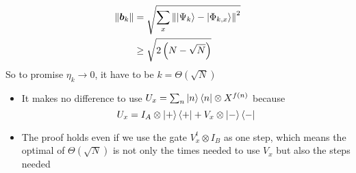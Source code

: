 \documentclass[11pt,a4paper]{article}%
\numberwithin{equation}{section}
\renewcommand*{\vec}[1]{\bm{#1}}%
\begin{document}
\begin{enumerate}
\begin{align}
        \Vert\vec b_k\Vert &= \sqrt{\sum_x\left\Vert\ket{\Psi_{k}}-\ket{\Phi_{k,x}}\right\Vert^2} \\
        &\ge \sqrt{2\left(N-\sqrt N\right)}
    \end{align}
    So to promise $\eta_k\to 0$, it have to be $k = \Theta(\sqrt N)$
    \begin{itemize}
        \item It makes no difference to use $U_x = \sum_n\ket n\bra n\otimes X^{f(n)}$ because
        \begin{equation}
            U_x = I_A\otimes\ket+\bra+ + V_x\otimes\ket-\bra-
        \end{equation}
        \item The proof holds even if we use the gate $V_x^t\otimes I_B$ as one step, which means the optimal of $\Theta(\sqrt N)$ is not only the times needed to use $V_x$ but also the steps needed
    \end{itemize}
\end{enumerate}
\end{document}
